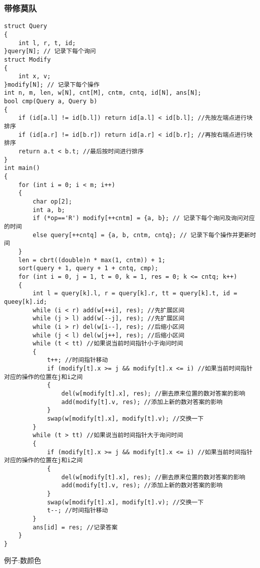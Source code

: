 \documentclass[a4paper, fontset=none]{ctexart}
\begin{document}
\subsubsection{带修莫队}
\begin{verbatim}
struct Query
{
    int l, r, t, id;
}query[N]; // 记录下每个询问
struct Modify
{
    int x, v;
}modify[N]; // 记录下每个操作
int n, m, len, w[N], cnt[M], cntm, cntq, id[N], ans[N];
bool cmp(Query a, Query b)
{
    if (id[a.l] != id[b.l]) return id[a.l] < id[b.l]; //先按左端点进行块排序
    if (id[a.r] != id[b.r]) return id[a.r] < id[b.r]; //再按右端点进行块排序
    return a.t < b.t; //最后按时间进行排序
}
int main()
{
    for (int i = 0; i < m; i++)
    {
        char op[2];
        int a, b;
        if (*op=='R') modify[++cntm] = {a, b}; // 记录下每个询问及询问对应的时间
        else query[++cntq] = {a, b, cntm, cntq}; // 记录下每个操作并更新时间
    }
    len = cbrt((double)n * max(1, cntm)) + 1;
    sort(query + 1, query + 1 + cntq, cmp);
    for (int i = 0, j = 1, t = 0, k = 1, res = 0; k <= cntq; k++)
    {
        int l = query[k].l, r = query[k].r, tt = query[k].t, id = queey[k].id;
        while (i < r) add(w[++i], res); //先扩展区间
        while (j > l) add(w[--j], res); //先扩展区间
        while (i > r) del(w[i--], res); //后缩小区间
        while (j < l) del(w[j++], res); //后缩小区间
        while (t < tt) //如果说当前时间指针小于询问时间
        {
            t++; //时间指针移动
            if (modify[t].x >= j && modify[t].x <= i) //如果当前时间指针对应的操作的位置在j和i之间
            {
                del(w[modify[t].x], res); //删去原来位置的数对答案的影响
                add(modify[t].v, res); //添加上新的数对答案的影响
            }
            swap(w[modify[t].x], modify[t].v); //交换一下
        }
        while (t > tt) //如果说当前时间指针大于询问时间
        {
            if (modify[t].x >= j && modify[t].x <= i) //如果当前时间指针对应的操作的位置在j和i之间
            {
                del(w[modify[t].x], res); //删去原来位置的数对答案的影响
                add(modify[t].v, res); //添加上新的数对答案的影响
            }
            swap(w[modify[t].x], modify[t].v); //交换一下
            t--; //时间指针移动
        }
        ans[id] = res; //记录答案
    }
}
\end{verbatim}
例子:数颜色
\end{document}
